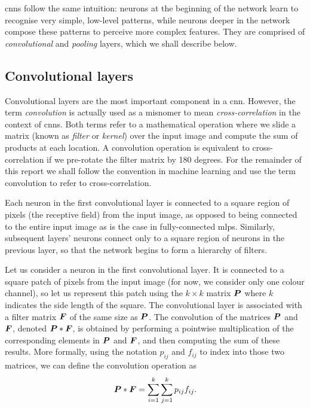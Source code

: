 \documentclass[../report.tex]{subfiles}
\begin{document}
\Glspl{cnn} follow the same intuition: neurons at the beginning of the network learn to recognise very simple, low-level patterns, while neurons deeper in the network compose these patterns to perceive more complex features.
They are comprised of \emph{convolutional} and \emph{pooling} layers, which we shall describe below.

\subsection{Convolutional layers}
\label{sec:convolutional_layers}
Convolutional layers are the most important component in a \gls{cnn}.
However, the term \emph{convolution} is actually used as a misnomer to mean \emph{cross-correlation} in the context of \glspl{cnn}.
Both terms refer to a mathematical operation where we slide a matrix (known as \emph{filter} or \emph{kernel}) over the input image and compute the sum of products at each location.
A convolution operation is equivalent to cross-correlation if we pre-rotate the filter matrix by 180 degrees.
For the remainder of this report we shall follow the convention in machine learning and use the term convolution to refer to cross-correlation.

Each neuron in the first convolutional layer is connected to a square region of pixels (the receptive field) from the input image, as opposed to being connected to the entire input image as is the case in fully-connected \glspl{mlp}.
Similarly, subsequent layers' neurons connect only to a square region of neurons in the previous layer, so that the network begins to form a hierarchy of filters.

Let us consider a neuron in the first convolutional layer.
It is connected to a square patch of pixels from the input image (for now, we consider only one colour channel), so let us represent this patch using the $k\times k$ matrix ${\bm{P}}$ where $k$ indicates the side length of the square.
The convolutional layer is associated with a filter matrix ${\bm{F}}$ of the same size as ${\bm{P}}$.
The convolution of the matrices ${\bm{P}}$ and ${\bm{F}}$, denoted ${\bm{P}} * {\bm{F}}$, is obtained by performing a pointwise multiplication of the corresponding elements in ${\bm{P}}$ and ${\bm{F}}$, and then computing the sum of these results.
More formally, using the notation $p_{ij}$ and $f_{ij}$ to index into those two matrices, we can define the convolution operation as
\begin{equation}
    {\bm{P}} * {\bm{F}} = \sum_{i=1}^k \sum_{j=1}^k p_{ij} f_{ij}.
\end{equation}
\end{document}
